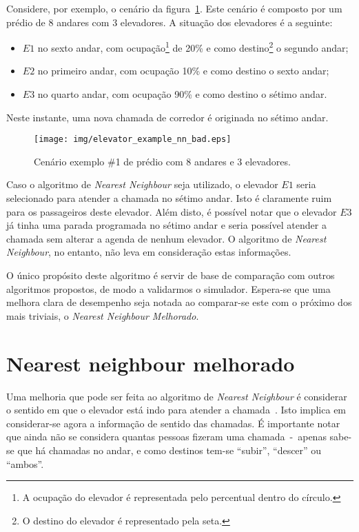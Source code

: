 Considere, por exemplo, o cenário da figura~\ref{fig:elevadores:nn:bad}. Este
cenário é composto por um prédio de 8 andares com 3 elevadores. A situação dos
elevadores é a seguinte:

\begin{itemize}
\item $E1$ no sexto andar, com ocupação\footnote{A ocupação do elevador é representada pelo percentual dentro do círculo.} de 20\% e como destino\footnote{O destino do elevador é representado pela seta.} o segundo andar;
\item $E2$ no primeiro andar, com ocupação 10\% e como destino o sexto andar;
\item $E3$ no quarto andar, com ocupação 90\% e como destino o sétimo andar.
\end{itemize}

Neste instante, uma nova chamada de corredor é originada no sétimo andar.

\begin{figure}[htb!]
  \centering
  \texttt{[image: img/elevator\_example\_nn\_bad.eps]}
  \caption{Cenário exemplo \#1 de prédio com 8 andares e 3 elevadores.}
\label{fig:elevadores:nn:bad}
\end{figure}

Caso o algoritmo de \textit{Nearest Neighbour} seja utilizado, o elevador $E1$
seria selecionado para atender a chamada no sétimo andar. Isto é claramente ruim
para os passageiros deste elevador. Além disto, é possível notar que o elevador
$E3$ já tinha uma parada programada no sétimo andar e seria possível atender a
chamada sem alterar a agenda de nenhum elevador. O algoritmo de \textit{Nearest
Neighbour}, no entanto, não leva em consideração estas informações.

O único propósito deste algoritmo é servir de base de comparação com outros
algoritmos propostos, de modo a validarmos o simulador. Espera-se que uma
melhora clara de desempenho seja notada ao comparar-se este com o próximo dos
mais triviais, o \textit{Nearest Neighbour Melhorado}.

\section{\label{sec:ai:nnm}Nearest neighbour melhorado}

Uma melhoria que pode ser feita ao algoritmo de \textit{Nearest Neighbour} é
considerar o sentido em que o elevador está indo para atender a
chamada~\cite{Friese20061908}. Isto implica em considerar-se agora a informação
de sentido das chamadas. É importante notar que ainda não se considera quantas
pessoas fizeram uma chamada~-~apenas sabe-se que há chamadas no andar, e como
destinos tem-se ``subir'', ``descer'' ou ``ambos''.

